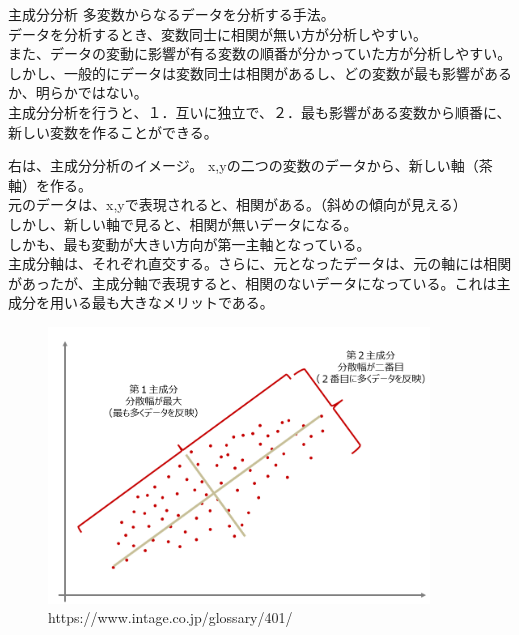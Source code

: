 \documentclass[dvipdfmx,autodetect-engine, unicode, 10pt, aspectratio=169]{beamer}
\begin{document}
\begin{frame}{主成分分析}
    \small
    多変数からなるデータを分析する手法。\\
    データを分析するとき、変数同士に相関が無い方が分析しやすい。  \\
    また、データの変動に影響が有る変数の順番が分かっていた方が分析しやすい。\\
    しかし、一般的にデータは変数同士は相関があるし、どの変数が最も影響があるか、明らかではない。\\
    主成分分析を行うと、１．互いに独立で、２．最も影響がある変数から順番に、新しい変数を作ることができる。

    \begin{minipage}{0.45\linewidth}\scriptsize
        右は、主成分分析のイメージ。
        x,yの二つの変数のデータから、新しい軸（茶軸）を作る。\\
        元のデータは、x,yで表現されると、相関がある。（斜めの傾向が見える）\\
        しかし、新しい軸で見ると、相関が無いデータになる。\\
        しかも、最も変動が大きい方向が第一主軸となっている。\\
        主成分軸は、それぞれ直交する。さらに、元となったデータは、元の軸には相関があったが、主成分軸で表現すると、相関のないデータになっている。これは主成分を用いる最も大きなメリットである。
    \end{minipage}
    \begin{minipage}{0.45\linewidth}
        \begin{figure}[h]
        \centering
            \includegraphics[width=0.9\textwidth]{PCA.png}
        \caption*{\tiny https://www.intage.co.jp/glossary/401/}
        \label{fig:mesh1}
        \end{figure}
    \end{minipage}
\end{frame}
\end{document}
